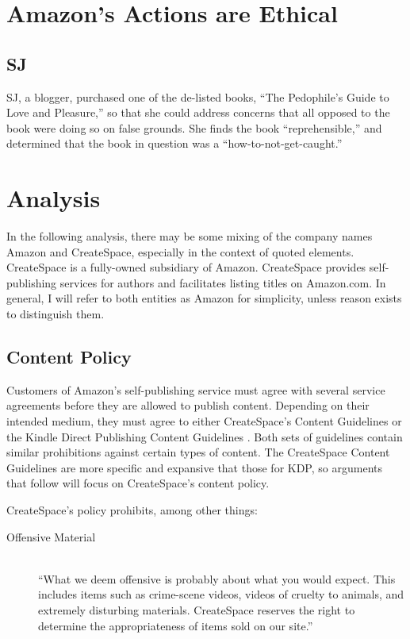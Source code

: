 \documentclass[11pt]{article}
\begin{document}
\begin{multicols}{2}
\section{Amazon's Actions are Ethical}

\subsection{SJ}

SJ, a blogger, purchased one of the de-listed books, ``The Pedophile's Guide to Love and Pleasure,'' so that she could address concerns that all opposed to the book were doing so on false grounds.  She finds the book ``reprehensible,'' and determined that the book in question was a ``how-to-not-get-caught.'' \cite{iasshole}

\section{Analysis}

In the following analysis, there may be some mixing of the company names Amazon and CreateSpace, especially in the context of quoted elements.  CreateSpace is a fully-owned subsidiary of Amazon.  CreateSpace provides self-publishing services for authors and facilitates listing titles on Amazon.com.  In general, I will refer to both entities as Amazon for simplicity, unless reason exists to distinguish them.

\subsection{Content Policy}

Customers of Amazon's self-publishing service must agree with several service agreements before they are allowed to publish content.  Depending on their intended medium, they must agree to either CreateSpace's Content Guidelines \cite{CreateSpaceContentGuidelines} or the Kindle Direct Publishing Content Guidelines \cite{AmazonKDPContentGuidelines}.  Both sets of guidelines contain similar prohibitions against certain types of content.  The CreateSpace Content Guidelines are more specific and expansive that those for KDP, so arguments that follow will focus on CreateSpace's content policy.

CreateSpace's policy prohibits, among other things:

\begin{description}
\item[Offensive Material] \hfill \\
      ``What we deem offensive is probably about what you would expect. This includes items such as crime-scene videos, videos of cruelty to animals, and extremely disturbing materials. CreateSpace reserves the right to determine the appropriateness of items sold on our site.'' \cite{CreateSpaceContentGuidelines}


\end{description}
\end{multicols}
\end{document}
